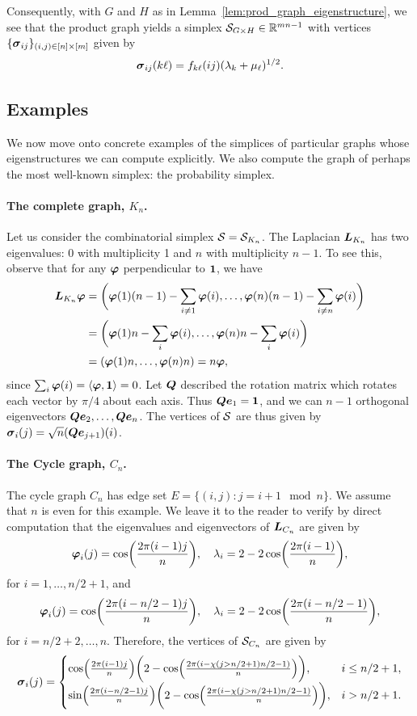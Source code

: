 Consequently, with $G$ and $H$ as in Lemma~\ref{lem:prod_graph_eigenstructure}, we see that the product graph yields a simplex $\mathcal{S}_{G\times H}\in\mathbb{R}^{mn-1}$ with vertices $\{\vb*{\sigma}_{ij}\}_{(i,j)\in[n]\times[m]}$ given by 
\[\vb*{\sigma}_{ij}(k\ell)=f_{k\ell}(ij)(\lambda_k+\mu_\ell)^{1/2}.\]


\subsection{Examples}
\label{sec:examples}

We now move onto concrete examples of the simplices of particular graphs whose eigenstructures we can compute explicitly. We also compute the graph of perhaps the most well-known simplex:  the probability simplex. 

\paragraph{The complete graph, $K_n$.}
Let us consider the combinatorial simplex $\mathcal{S}=\mathcal{S}_{K_n}$.  The Laplacian $\vb*{L}_{K_n}$ has two eigenvalues: 0 with multiplicity 1 and $n$ with multiplicity $n-1$. To see this, observe that for any $\vb*{\varphi}$ perpendicular to $\vb{1}$, we have 
\begin{align*}
\vb*{L}_{K_n}\vb*{\varphi} &= \bigg(\vb*{\varphi}(1)(n-1)-\sum_{i\neq 1}\vb*{\varphi}(i),\dots,\vb*{\varphi}(n)(n-1)-\sum_{i\neq n}\vb*{\varphi}(i)\bigg) \\
&= \bigg(\vb*{\varphi}(1)n - \sum_i \vb*{\varphi}(i), \dots,\vb*{\varphi}(n)n - \sum_i \vb*{\varphi}(i)\bigg) \\
&= (\vb*{\varphi}(1)n,\dots,\vb*{\varphi}(n)n) = n\vb*{\varphi},
\end{align*}
since $\sum_i\vb*{\varphi}(i)=\langle \vb*{\varphi},\vb{1}\rangle =0$. Let $\vb*{Q}$  described the rotation matrix which rotates each vector  by $\pi/4$  about each axis. Thus $\vb*{Q}\vb*{e}_1=\vb{1}$, and we can $n-1$ orthogonal eigenvectors $\vb*{Q}\vb*{e}_2,\dots,\vb*{Q}\vb*{e}_n$. The vertices of $\mathcal{S}$  are thus given by $\vb*{\sigma}_i(j) = \sqrt{n}(\vb*{Q}\vb*{e}_{j+1})(i)$. 

\paragraph{The Cycle graph,  $C_n$.}
The cycle graph $C_n$ has edge set $E=\{(i,j):j=i+1\mod n\}$. We assume that $n$ is even for this example. 
We leave it to the reader to verify by direct computation  that the eigenvalues  and eigenvectors of $\vb*{L}_{C_n}$ are given by 
\[\vb*{\varphi}_i(j) = \cos(\frac{2\pi(i-1)j}{n}),\quad \lambda_i = 2-2\cos(\frac{2\pi(i-1)}{n}),\]
for $i=1,\dots,n/2+1$, and 
\[\vb*{\varphi}_i(j) = \cos(\frac{2\pi(i-n/2-1)j}{n}),\quad \lambda_i = 2-2\cos(\frac{2\pi(i-n/2-1)}{n}),\]
for $i=n/2+2,\dots,n$. Therefore,  the vertices of $\mathcal{S}_{C_n}$ are given by  
\begin{equation*}
\vb*{\sigma}_i(j) = \begin{cases}
\cos(\frac{2\pi(i-1)j}{n})\bigg(2-\cos(\frac{2\pi(i-\chi(j>n/2+1)n/2 -1)}{n})\bigg),& i\leq n/2+1, \\
\sin(\frac{2\pi(i-n/2-1)j}{n})\bigg(2-\cos(\frac{2\pi(i-\chi(j>n/2+1)n/2 -1)}{n})\bigg),& i> n/2+1.
\end{cases}
\end{equation*}

